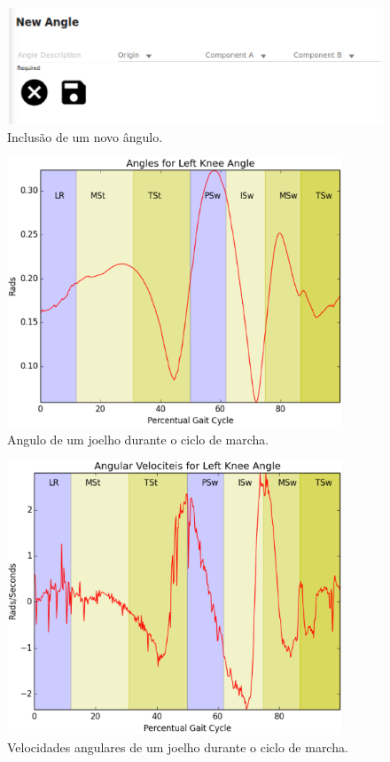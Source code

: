\begin{figure}[ht]
	\centering
	\includegraphics[width=15cm]{figuras/tela24.eps}
	\caption{Inclusão de um novo ângulo.}
\label{tela24}
\end{figure}

\begin{figure}[ht]
	\centering
	\includegraphics[width=10cm]{figuras/tela25.eps}
	\caption{Angulo de um joelho durante o ciclo de marcha.}
\label{tela25}
\end{figure}

\begin{figure}[ht]
	\centering
	\includegraphics[width=10cm]{figuras/tela26.eps}
	\caption{Velocidades angulares de um joelho durante o ciclo de marcha.}
\label{tela26}
\end{figure}





